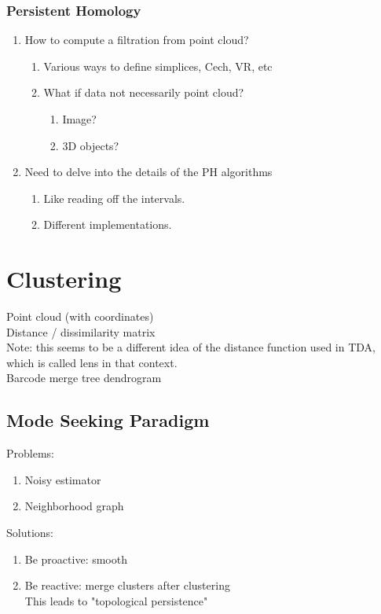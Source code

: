 \documentclass[10pt,a4paper]{report}
\begin{document}
\subsubsection{Persistent Homology}
\begin{enumerate}
	\item How to compute a filtration from point cloud?
	\begin{enumerate}
		\item Various ways to define simplices, Cech, VR, etc
		\item What if data not necessarily point cloud?
		\begin{enumerate}
			\item Image?
			\item 3D objects?
		\end{enumerate}
	\end{enumerate}
	\item Need to delve into the details of the PH algorithms
	\begin{enumerate}
		\item Like reading off the intervals.
		\item Different implementations.
	\end{enumerate}
\end{enumerate}

\section{Clustering}
Point cloud (with coordinates)\\

Distance / dissimilarity matrix\\

Note: this seems to be a different idea of the distance function used in TDA, which is called lens in that context.\\

Barcode \textrightarrow merge tree \textrightarrow dendrogram

\subsection{Mode Seeking Paradigm}
Problems:
\begin{enumerate}
	\item Noisy estimator
	\item Neighborhood graph
\end{enumerate}
Solutions:
\begin{enumerate}
	\item Be proactive: smooth
	\item Be reactive: merge clusters after clustering\\
		  This leads to "topological persistence"
\end{enumerate}
\end{document}
